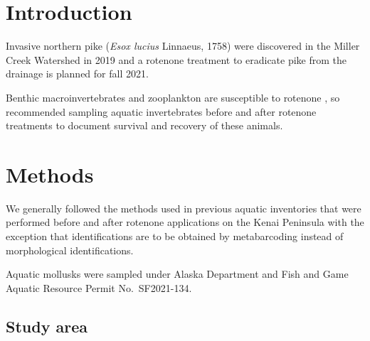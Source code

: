 \begin{multicols}{2}

\section{Introduction}

Invasive northern pike (\textit{Esox lucius} Linnaeus, 1758) were discovered in the Miller Creek Watershed in 2019 \citep{KNWR2021} and a rotenone treatment to eradicate pike from the drainage is planned for fall 2021.

Benthic macroinvertebrates and zooplankton are susceptible to rotenone \citep{Finlaysonetal2018}, so \citet{Finlaysonetal2018} recommended sampling aquatic invertebrates before and after rotenone treatments to document survival and recovery of these animals.




\section{Methods}

We generally followed the methods used in previous aquatic inventories that were performed before and after rotenone applications on the Kenai Peninsula \citep{Massengill2014, Massengill2017} with the exception that identifications are to be obtained by metabarcoding instead of morphological identifications.

Aquatic mollusks were sampled under Alaska Department and Fish and Game Aquatic Resource Permit No.\ SF2021-134.

\subsection{Study area}


\end{multicols}
